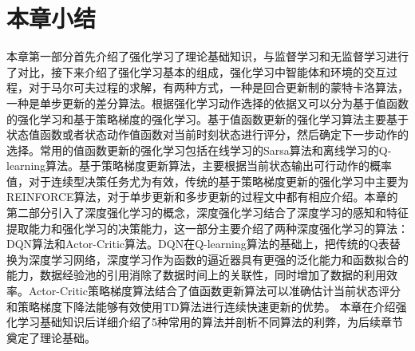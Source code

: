 \section{本章小结}
本章第一部分首先介绍了强化学习了理论基础知识，与监督学习和无监督学习进行了对比，接下来介绍了强化学习基本的组成，强化学习中智能体和环境的交互过程，对于马尔可夫过程的求解，有两种方式，一种是回合更新制的蒙特卡洛算法，一种是单步更新的差分算法。根据强化学习动作选择的依据又可以分为基于值函数的强化学习和基于策略梯度的强化学习。基于值函数更新的强化学习算法主要基于状态值函数或者状态动作值函数对当前时刻状态进行评分，然后确定下一步动作的选择。常用的值函数更新的强化学习包括在线学习的Sarsa算法和离线学习的Q-learning算法。基于策略梯度更新算法，主要根据当前状态输出可行动作的概率值，对于连续型决策任务尤为有效，传统的基于策略梯度更新的强化学习中主要为REINFORCE算法，对于单步更新和多步更新的过程文中都有相应介绍。本章的第二部分引入了深度强化学习的概念，深度强化学习结合了深度学习的感知和特征提取能力和强化学习的决策能力，这一部分主要介绍了两种深度强化学习的算法：DQN算法和Actor-Critic算法。DQN在Q-learning算法的基础上，把传统的Q表替换为深度学习网络，深度学习作为函数的逼近器具有更强的泛化能力和函数拟合的能力，数据经验池的引用消除了数据时间上的关联性，同时增加了数据的利用效率。Actor-Critic策略梯度算法结合了值函数更新算法可以准确估计当前状态评分和策略梯度下降法能够有效使用TD算法进行连续快速更新的优势。
本章在介绍强化学习基础知识后详细介绍了5种常用的算法并剖析不同算法的利弊，为后续章节奠定了理论基础。
